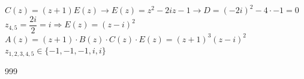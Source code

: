 \documentclass[a4paper]{article}
\begin{document}
$ C(z) = (z + 1)E(z)  \rightarrow E(z) = z^2 -2iz - 1 \rightarrow D = (-2i)^2 - 4 \cdot -1 = 0 $\\

$ z_{4,5} = \dfrac{2i}{2} = i \Rightarrow E(z) = (z - i)^2 $\\

$ A(z) = (z + 1) \cdot B(z) \cdot C(z) \cdot E(z) = (z + 1)^3(z - i)^2 $\\

$ z_{1,2,3, 4, 5}\in \{-1, -1, -1, i, i\} $\\

\begin{thebibliography}{999}
\end{thebibliography}
\end{document}

